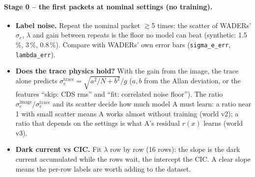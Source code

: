 \documentclass[10pt]{article}
\newcommand{\code}[1]{\texttt{#1}}
\begin{document}
\paragraph{Stage 0 -- the first packets at nominal settings (no training).}
\begin{itemize}
\item \textbf{Label noise.} Repeat the nominal packet $\gtrsim$5 times: the scatter of WADERs' $\sigma_e$, $\lambda$ and gain between repeats is the
  floor no model can beat (synthetic: 1.5\,\%, 3\,\%, 0.8\,\%). Compare with WADERs' own error bars (\code{sigma\_e\_err}, \code{lambda\_err}).
\item \textbf{Does the trace physics hold?} With the gain from the image, the trace alone predicts
  $\sigma_e^\text{trace} = \sqrt{a^2/N + b^2}/g$ ($a, b$ from the Allan deviation, or the features ``skip: CDS rms'' and
  ``fit: correlated noise floor''). The ratio $\sigma_e^\text{image}/\sigma_e^\text{trace}$ and its scatter decide how much model A must
  learn: a ratio near 1 with small scatter means A works almost without training (world v2); a ratio that depends on the settings
  is what A's residual $r(x)$ learns (world v3).
\item \textbf{Dark current vs CIC.} Fit $\lambda$ row by row (16 rows): the slope is the dark current accumulated while the rows wait, the
  intercept the CIC. A clear slope means the per-row labels are worth adding to the dataset.
\end{itemize}
\end{document}
